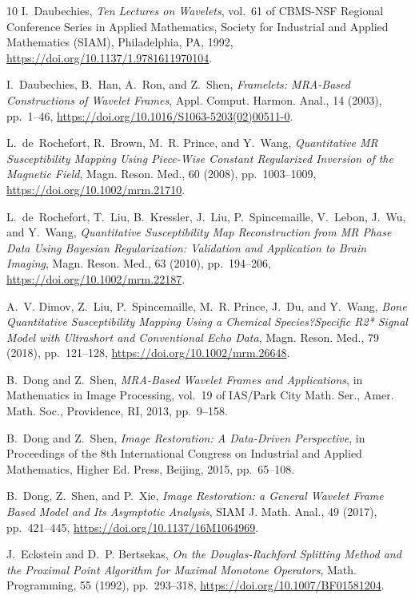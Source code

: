 \documentclass[reqno]{siamonline1116}
\numberwithin{theorem}{section}
\numberwithin{equation}{section}
\begin{document}
\begin{thebibliography}{10}
{\sc I.~Daubechies}, {\em Ten Lectures on Wavelets}, vol.~61 of CBMS-NSF
  Regional Conference Series in Applied Mathematics, Society for Industrial and
  Applied Mathematics (SIAM), Philadelphia, PA, 1992,
  \url{https://doi.org/10.1137/1.9781611970104}.

{\sc I.~Daubechies, B.~Han, A.~Ron, and Z.~Shen}, {\em {Framelets: {MRA}-Based
  Constructions of Wavelet Frames}}, Appl. Comput. Harmon. Anal., 14 (2003),
  pp.~1--46, \url{https://doi.org/10.1016/S1063-5203(02)00511-0}.

{\sc L.~de~Rochefort, R.~Brown, M.~R. Prince, and Y.~Wang}, {\em {Quantitative
  MR Susceptibility Mapping Using Piece-Wise Constant Regularized Inversion of
  the Magnetic Field}}, Magn. Reson. Med., 60 (2008), pp.~1003--1009,
  \url{https://doi.org/10.1002/mrm.21710}.

{\sc L.~de~Rochefort, T.~Liu, B.~Kressler, J.~Liu, P.~Spincemaille, V.~Lebon,
  J.~Wu, and Y.~Wang}, {\em {Quantitative Susceptibility Map Reconstruction
  from MR Phase Data Using Bayesian Regularization: Validation and Application
  to Brain Imaging}}, Magn. Reson. Med., 63 (2010), pp.~194--206,
  \url{https://doi.org/10.1002/mrm.22187}.

{\sc A.~V. Dimov, Z.~Liu, P.~Spincemaille, M.~R. Prince, J.~Du, and Y.~Wang},
  {\em {Bone Quantitative Susceptibility Mapping Using a Chemical
  Species?Specific R2* Signal Model with Ultrashort and Conventional Echo
  Data}}, Magn. Reson. Med., 79 (2018), pp.~121--128,
  \url{https://doi.org/10.1002/mrm.26648}.

{\sc B.~Dong and Z.~Shen}, {\em {M{RA}-Based Wavelet Frames and Applications}},
  in Mathematics in Image Processing, vol.~19 of IAS/Park City Math. Ser.,
  Amer. Math. Soc., Providence, RI, 2013, pp.~9--158.

{\sc B.~Dong and Z.~Shen}, {\em {Image Restoration: A Data-Driven
  Perspective}}, in Proceedings of the 8th {I}nternational {C}ongress on
  {I}ndustrial and {A}pplied {M}athematics, Higher Ed. Press, Beijing, 2015,
  pp.~65--108.

{\sc B.~Dong, Z.~Shen, and P.~Xie}, {\em {Image Restoration: a General Wavelet
  Frame Based Model and Its Asymptotic Analysis}}, SIAM J. Math. Anal., 49
  (2017), pp.~421--445, \url{https://doi.org/10.1137/16M1064969}.

{\sc J.~Eckstein and D.~P. Bertsekas}, {\em {On the {D}ouglas-{R}achford
  Splitting Method and the Proximal Point Algorithm for Maximal Monotone
  Operators}}, Math. Programming, 55 (1992), pp.~293--318,
  \url{https://doi.org/10.1007/BF01581204}.


\end{thebibliography}
\end{document}
